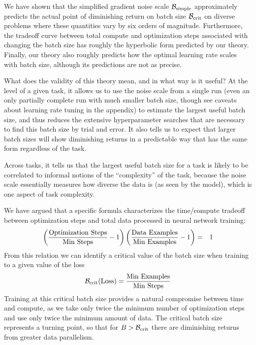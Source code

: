 \documentclass[english]{article}
\newcommand{\CB}{{\cal B}}
\begin{document}
\label{sec:Discussion}

We have shown that the simplified gradient noise scale $\mathcal{B}_{{\rm simple}}$ approximately predicts the actual point of diminishing return on batch size $\CB_{\rm crit}$ on diverse problems where these quantities vary by six orders of magnitude.  Furthermore, the tradeoff curve between total compute and optimization steps associated with changing the batch size has roughly the hyperbolic form predicted by our theory.  Finally, our theory also roughly predicts how the optimal learning rate scales with batch size, although its predictions are not  as precise.

What does the validity of this theory mean, and in what way is it useful?  At the level of a given task, it allows us to use the noise scale from a single run (even an only partially complete run with much smaller batch size, though see caveats about learning rate tuning in the appendix) to estimate the largest useful batch size, and thus reduces the extensive hyperparameter searches that are necessary to find this batch size by trial and error.  It also tells us to expect that larger batch sizes will show diminishing returns in a predictable way that has the same form regardless of the task.

Across tasks, it tells us that the largest useful batch size for a task is likely to be correlated to informal notions of the ``complexity'' of the task, because the noise scale essentially measures how diverse the data is (as seen by the model), which is one aspect of  task complexity.   %



We have argued that a specific formula characterizes  the time/compute tradeoff between optimization steps and total data processed in neural network training:
\begin{eqnarray}
\left(\frac{{\rm Optimization\ Steps}}{{\rm Min\ Steps}}-1\right)\left(\frac{{\rm Data\ Examples}}{{\rm Min\ Examples}}-1\right) & = & 1\label{eq:TradeoffDiscussion}
\end{eqnarray}
From this relation we can identify a critical value of the batch size when training to a given value of the loss
\[
\mathcal{B}_{{\rm crit}}({\rm Loss})=\frac{\text{Min Examples}}{\text{Min Steps}}
\]
Training at this critical batch size provides a natural compromise between time and compute, as we take only twice the minimum number of optimization steps and use only twice the minimum amount of data.  The critical batch size represents a turning point, so that for $B > \CB_{\rm crit}$ there are diminishing returns from greater data parallelism.
\end{document}
